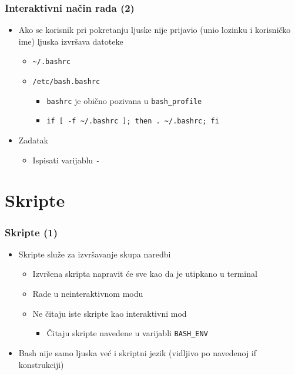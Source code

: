 \documentclass[table,usenames,dvipsnames]{beamer}
\newcommand{\shell}[1]{\texttt{#1}}
\begin{document}
\begin{frame}[t]
\frametitle{Interaktivni način rada (2)}
\begin{itemize}
  \item Ako se korisnik pri pokretanju ljuske nije prijavio (unio lozinku i
        korisničko ime) ljuska izvršava datoteke
  \begin{itemize}
    \item \shell{\~{}/.bashrc}
    \item \shell{/etc/bash.bashrc}
    \begin{itemize}
      \item \shell{bashrc} je obično pozivana u \shell{bash\_profile}
      \item[] \shell{if [ -f \~{}/.bashrc ]; then . \~{}/.bashrc; fi}
    \end{itemize}
  \end{itemize}
  \item Zadatak
  \begin{itemize}
    \item Ispisati varijablu \shell{-}
  \end{itemize}
\end{itemize}
\end{frame}

\section{Skripte}
\begin{frame}[t]
\frametitle{Skripte (1)}
\begin{itemize}
  \item Skripte služe za izvršavanje skupa naredbi
  \begin{itemize}
    \item Izvršena skripta napravit će sve kao da je utipkano u terminal
    \item Rade u neinteraktivnom modu
    \item Ne čitaju iste skripte kao interaktivni mod
    \begin{itemize}
      \item Čitaju skripte navedene u varijabli \shell{BASH\_ENV}
    \end{itemize}
  \end{itemize}
  \item Bash nije samo ljuska već i skriptni jezik (vidljivo po navedenoj 
        if konstrukciji)
\end{itemize}
\end{frame}
\end{document}
